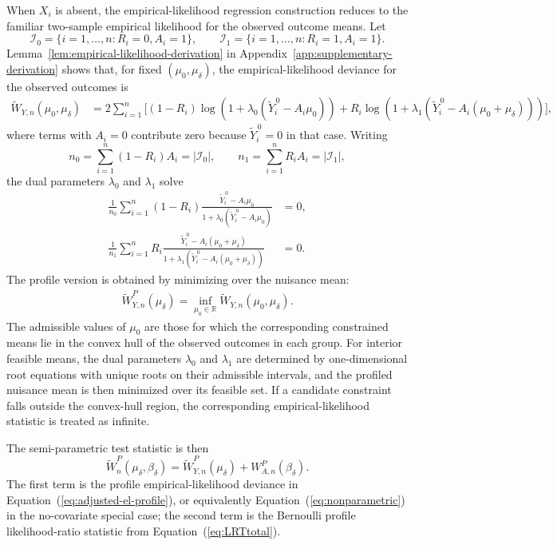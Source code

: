 \documentclass[11pt]{article}
\begin{document}
When $X_i$ is absent, the empirical-likelihood regression construction reduces to the familiar two-sample empirical likelihood for the observed outcome means. Let
\[
\mathcal{I}_0 = \{i = 1,\ldots,n : R_i = 0, A_i = 1\},
\qquad
\mathcal{I}_1 = \{i = 1,\ldots,n : R_i = 1, A_i = 1\}.
\]
Lemma~\ref{lem:empirical-likelihood-derivation} in Appendix~\ref{app:supplementary-derivation} shows that, for fixed $(\mu_0,\mu_\delta)$, the empirical-likelihood deviance for the observed outcomes is
\begin{align}
  \widetilde{W}_{Y,n}(\mu_0,\mu_\delta)
  &= 2\sum_{i = 1}^n \Biggl[
    (1-R_i)\log\left(1 + \lambda_0(\widetilde{Y}_i^{\,0} - A_i\mu_0)\right)
    + R_i\log\left(1 + \lambda_1(\widetilde{Y}_i^{\,0} - A_i(\mu_0 + \mu_\delta))\right)
  \Biggr],\label{eq:nonparametric}
\end{align}
where terms with $A_i = 0$ contribute zero because $\widetilde{Y}_i^{\,0} = 0$ in that case. Writing
\[
  n_0 = \sum_{i = 1}^n (1-R_i)A_i = |\mathcal{I}_0|,
  \qquad
  n_1 = \sum_{i = 1}^n R_iA_i = |\mathcal{I}_1|,
\]
the dual parameters $\lambda_0$ and $\lambda_1$ solve
\begin{align*}
  \frac{1}{n_0}\sum_{i = 1}^n
  (1-R_i)\frac{\widetilde{Y}_i^{\,0} - A_i\mu_0}
  {1 + \lambda_0(\widetilde{Y}_i^{\,0} - A_i\mu_0)} &= 0,\\
  \frac{1}{n_1}\sum_{i = 1}^n
  R_i\frac{\widetilde{Y}_i^{\,0} - A_i(\mu_0 + \mu_\delta)}
  {1 + \lambda_1(\widetilde{Y}_i^{\,0} - A_i(\mu_0 + \mu_\delta))} &= 0.
\end{align*}
The profile version is obtained by minimizing over the nuisance mean:
\begin{align*}
  \widetilde{W}_{Y,n}^P(\mu_\delta) = \inf_{\mu_0 \in \mathbb{R}} \widetilde{W}_{Y,n}(\mu_0,\mu_\delta).
\end{align*}
The admissible values of $\mu_0$ are those for which the corresponding constrained means lie in the convex hull of the observed outcomes in each group. For interior feasible means, the dual parameters $\lambda_0$ and $\lambda_1$ are determined by one-dimensional root equations with unique roots on their admissible intervals, and the profiled nuisance mean is then minimized over its feasible set. If a candidate constraint falls outside the convex-hull region, the corresponding empirical-likelihood statistic is treated as infinite.

The semi-parametric test statistic is then
\begin{equation}
  \widetilde{W}_n^P(\mu_\delta, \beta_\delta)
  = \widetilde{W}_{Y,n}^P(\mu_\delta) + W_{A,n}^P(\beta_\delta).\label{eq:LRT_SP_total}
\end{equation}
The first term is the profile empirical-likelihood deviance in Equation~(\ref{eq:adjusted-el-profile}), or equivalently Equation~(\ref{eq:nonparametric}) in the no-covariate special case; the second term is the Bernoulli profile likelihood-ratio statistic from Equation~(\ref{eq:LRTtotal}).
\end{document}
